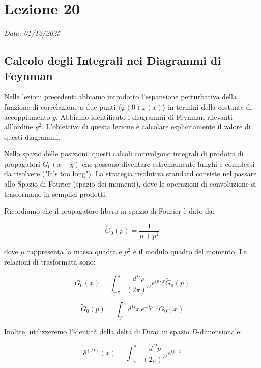\chapter{Lezione 20}
\label{chap:lezione_20}

\begin{flushright}
\textit{Data: 01/12/2025}
\end{flushright}

\section{Calcolo degli Integrali nei Diagrammi di Feynman}

Nelle lezioni precedenti abbiamo introdotto l'espansione perturbativa della funzione di correlazione a due punti $\langle \varphi(0) \varphi(x) \rangle$ in termini della costante di accoppiamento $g$. Abbiamo identificato i diagrammi di Feynman rilevanti all'ordine $g^2$.
L'obiettivo di questa lezione è calcolare esplicitamente il valore di questi diagrammi.

\noindent Nello spazio delle posizioni, questi calcoli coinvolgono integrali di prodotti di propagatori $G_0(x-y)$ che possono diventare estremamente lunghi e complessi da risolvere ("It's too long").
La strategia risolutiva standard consiste nel passare allo Spazio di Fourier (spazio dei momenti), dove le operazioni di convoluzione si trasformano in semplici prodotti. 

\noindent Ricordiamo che il propagatore libero in spazio di Fourier è dato da:

\begin{equation}
\tilde{G}_0(p) = \frac{1}{\mu + p^2}
\end{equation}

dove $\mu$ rappresenta la massa quadra e $p^2$ è il modulo quadro del momento. Le relazioni di trasformata sono:

\begin{equation}
G_0(x) = \int_{-\pi}^{\pi} \frac{d^D p}{(2\pi)^D} e^{i p \cdot x} \tilde{G}_0(p)
\end{equation}

\begin{equation}
\tilde{G}_0(p) = \int_{V} d^D x \, e^{-i p \cdot x} G_0(x)
\end{equation}

Inoltre, utilizzeremo l'identità della delta di Dirac in spazio $D$-dimensionale:

\begin{equation}
\delta^{(D)}(x) = \int_{-\pi}^{\pi} \frac{d^D p}{(2\pi)^D} e^{i p \cdot x}
\end{equation}

